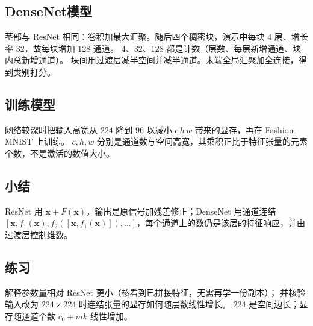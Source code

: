 \subsection{DenseNet模型}

茎部与 ResNet 相同：卷积加最大汇聚。随后四个稠密块，演示中每块 $4$ 层、增长率 $32$，故每块增加 $128$ 通道。
$4$、$32$、$128$ 都是计数（层数、每层新增通道、块内总新增通道）。
块间用过渡层减半空间并减半通道。末端全局汇聚加全连接，得到类别打分。

\subsection{训练模型}

网络较深时把输入高宽从 $224$ 降到 $96$ 以减小
$c\,h\,w$ 带来的显存，再在 Fashion-MNIST 上训练。
$c,h,w$ 分别是通道数与空间高宽，其乘积正比于特征张量的元素个数，不是激活的数值大小。

\subsection{小结}

ResNet 用 $\bm{x}+F(\bm{x})$，输出是原信号加残差修正；DenseNet 用通道连结
$[\bm{x},f_1(\bm{x}),f_2([\bm{x},f_1(\bm{x})]),\ldots]$，每个通道上的数仍是该层的特征响应，并由过渡层控制维数。

\subsection{练习}

解释参数量相对 ResNet 更小（核看到已拼接特征，无需再学一份副本）；
并核验输入改为 $224\times 224$ 时连结张量的显存如何随层数线性增长。
$224$ 是空间边长；显存随通道个数 $c_0+mk$ 线性增加。
